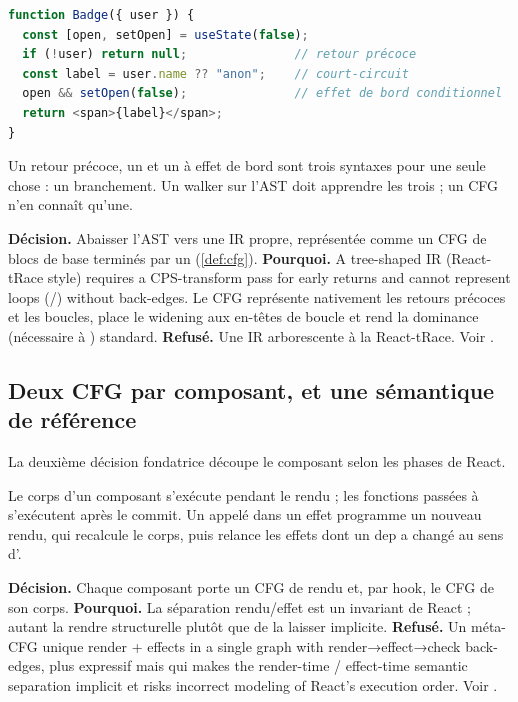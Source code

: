 \begin{lstlisting}[language=TypeScript,caption={Trois formes syntaxiques pour un même flot de contrôle}]
function Badge({ user }) {
  const [open, setOpen] = useState(false);
  if (!user) return null;               // retour précoce
  const label = user.name ?? "anon";    // court-circuit
  open && setOpen(false);               // effet de bord conditionnel
  return <span>{label}</span>;
}
\end{lstlisting}

Un retour précoce, un  et un \code{\&\&} à effet de bord sont trois syntaxes pour une seule chose : un branchement. Un walker sur l'AST doit apprendre les trois ; un CFG n'en connaît qu'une.

\begin{decision}
\textbf{Décision.} Abaisser l'AST vers une IR propre, représentée comme un CFG de blocs de base terminés par un  (\cref{def:cfg}). \textbf{Pourquoi.} \og A tree-shaped IR (React-tRace style) requires a CPS-transform pass for early returns and cannot represent loops (/) without back-edges.\fg{} Le CFG représente nativement les retours précoces et les boucles, place le widening aux en-têtes de boucle et rend la dominance (nécessaire à ) standard. \textbf{Refusé.} Une IR arborescente à la React-tRace. Voir .
\end{decision}

\subsection{Deux CFG par composant, et une sémantique de référence}

La deuxième décision fondatrice découpe le composant selon les phases de React.

\begin{react}[phases]
Le corps d'un composant s'exécute pendant le rendu ; les fonctions passées à  s'exécutent après le commit. Un  appelé dans un effet programme un nouveau rendu, qui recalcule le corps, puis relance les effets dont un dep a changé au sens d'.
\end{react}

\begin{decision}
\textbf{Décision.} Chaque composant porte un CFG de rendu et, par hook, le CFG de son corps. \textbf{Pourquoi.} La séparation rendu/effet est un invariant de React ; autant la rendre structurelle plutôt que de la laisser implicite. \textbf{Refusé.} Un méta-CFG unique \og render + effects in a single graph with render→effect→check back-edges\fg{}, plus expressif mais qui \og makes the render-time / effect-time semantic separation implicit\fg{} et \og risks incorrect modeling of React's execution order\fg{}. Voir .
\end{decision}

